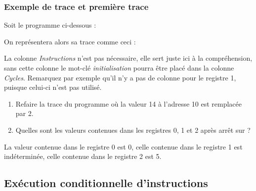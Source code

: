 \subsubsection{Exemple de trace et première trace}


\begin{minipage}[t]{0.35\linewidth}
Soit le programme ci-dessous :

\end{minipage}\hfill
\begin{minipage}[t]{0.6\linewidth}
On représentera alors sa trace comme ceci : 
\bigskip


\end{minipage}
\medskip

La colonne \emph{Instructions} n'est pas nécessaire, elle sert juste ici à la compréhension, sans cette colonne le mot-clé \emph{initialisation} pourra être placé dans la colonne \emph{Cycles}. Remarquez par exemple qu'il n'y a pas de colonne pour le registre 1, puisque celui-ci n'est pas utilisé.


\begin{enumerate}
\item Refaire la trace du programme où la valeur 14 à l'adresse 10 est remplacée
  par 2.

\item  Quelles sont les valeurs contenues dans les registres 0, 1 et 2
  après arrêt sur  ?
\end{enumerate}
\begin{correction}
  

La valeur contenue dans le registre 0 est 0, celle contenue dans le registre 1 est indéterminée, celle contenue dans le registre 2 est 5.
\end{correction}

\subsection{Exécution conditionnelle d'instructions}

